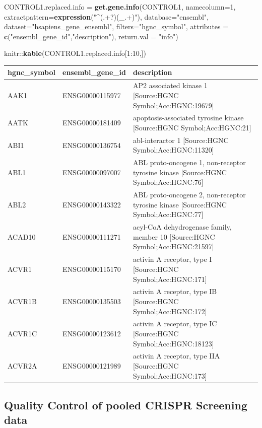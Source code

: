 \documentclass[]{article}
\newenvironment{Shaded}{\begin{snugshade}}{\end{snugshade}}
\newcommand{\KeywordTok}[1]{\textcolor[rgb]{0.13,0.29,0.53}{\textbf{{#1}}}}
\newcommand{\DataTypeTok}[1]{\textcolor[rgb]{0.13,0.29,0.53}{{#1}}}
\newcommand{\DecValTok}[1]{\textcolor[rgb]{0.00,0.00,0.81}{{#1}}}
\newcommand{\StringTok}[1]{\textcolor[rgb]{0.31,0.60,0.02}{{#1}}}
\newcommand{\NormalTok}[1]{{#1}}
\begin{document}
\begin{Shaded}
\begin{Highlighting}[]
\NormalTok{CONTROL1.replaced.info =}\StringTok{ }\KeywordTok{get.gene.info}\NormalTok{(CONTROL1, }\DataTypeTok{namecolumn=}\DecValTok{1}\NormalTok{,}
      \DataTypeTok{extractpattern=}\KeywordTok{expression}\NormalTok{(}\StringTok{"^(.+?)(_.+)"}\NormalTok{), }\DataTypeTok{database=}\StringTok{"ensembl"}\NormalTok{, }\DataTypeTok{dataset=}\StringTok{"hsapiens_gene_ensembl"}\NormalTok{,}
      \DataTypeTok{filters=}\StringTok{"hgnc_symbol"}\NormalTok{, }\DataTypeTok{attributes =} \KeywordTok{c}\NormalTok{(}\StringTok{"ensembl_gene_id"}\NormalTok{,}\StringTok{"description"}\NormalTok{), }\DataTypeTok{return.val =} \StringTok{"info"}\NormalTok{)}

\NormalTok{knitr::}\KeywordTok{kable}\NormalTok{(CONTROL1.replaced.info[}\DecValTok{1}\NormalTok{:}\DecValTok{10}\NormalTok{,])}
\end{Highlighting}
\end{Shaded}

\begin{longtable}[c]{@{}lll@{}}
\toprule
hgnc\_symbol & ensembl\_gene\_id & description\tabularnewline
\midrule
\endhead
AAK1 & ENSG00000115977 & AP2 associated kinase 1 {[}Source:HGNC
Symbol;Acc:HGNC:19679{]}\tabularnewline
AATK & ENSG00000181409 & apoptosis-associated tyrosine kinase
{[}Source:HGNC Symbol;Acc:HGNC:21{]}\tabularnewline
ABI1 & ENSG00000136754 & abl-interactor 1 {[}Source:HGNC
Symbol;Acc:HGNC:11320{]}\tabularnewline
ABL1 & ENSG00000097007 & ABL proto-oncogene 1, non-receptor tyrosine
kinase {[}Source:HGNC Symbol;Acc:HGNC:76{]}\tabularnewline
ABL2 & ENSG00000143322 & ABL proto-oncogene 2, non-receptor tyrosine
kinase {[}Source:HGNC Symbol;Acc:HGNC:77{]}\tabularnewline
ACAD10 & ENSG00000111271 & acyl-CoA dehydrogenase family, member 10
{[}Source:HGNC Symbol;Acc:HGNC:21597{]}\tabularnewline
ACVR1 & ENSG00000115170 & activin A receptor, type I {[}Source:HGNC
Symbol;Acc:HGNC:171{]}\tabularnewline
ACVR1B & ENSG00000135503 & activin A receptor, type IB {[}Source:HGNC
Symbol;Acc:HGNC:172{]}\tabularnewline
ACVR1C & ENSG00000123612 & activin A receptor, type IC {[}Source:HGNC
Symbol;Acc:HGNC:18123{]}\tabularnewline
ACVR2A & ENSG00000121989 & activin A receptor, type IIA {[}Source:HGNC
Symbol;Acc:HGNC:173{]}\tabularnewline
\bottomrule
\end{longtable}

\newpage

\subsection{Quality Control of pooled CRISPR Screening
data}\label{quality-control-of-pooled-crispr-screening-data}
\end{document}
